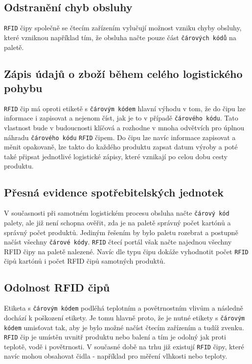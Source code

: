 \documentclass[czech,BP]{thesiskiv}
\begin{document}
\subsection{Odstranění chyb obsluhy}
\texttt{RFID} čipy společně se čtecím zařízením vylučují možnost vzniku chyby obsluhy, které vzniknou například tím, že obsluha načte pouze část \texttt{čárových kódů} na paletě.\cite{dolevcek2010identifikace}

\subsection{Zápis údajů o zboží během celého logistického pohybu}
\texttt{RFID} čip má oproti etiketě s \texttt{čárovým kódem} hlavní výhodu v tom, že do čipu lze informace i zapisovat a nejenom číst, jak je to v případě \texttt{čárového kódu}. Tato vlastnost bude v budoucnosti klíčová a rozhodne v mnoha odvětvích pro úplnou náhradu \texttt{čárového kódu} \texttt{RFID} čipem. Do čipu lze navíc informace zapisovat a měnit opakovaně, lze takto do každého produktu zapsat datum výroby a poté také připsat jednotlivé logistické zápisy, které vznikají po celou dobu cesty produktu.\cite{dolevcek2010identifikace}

\subsection{Přesná evidence spotřebitelských jednotek}
V současnosti při samotném logistickém procesu obsluha načte \texttt{čárový kód} palety, ale již není schopna ověřit, zda je na paletě správný počet kartónů a správný počet produktů. Jediným řešením by bylo paletu rozebrat a postupně načíst všechny \texttt{čárové kódy}. \texttt{RFID} čtecí portál však načte najednou všechny RFID čipy na paletě nalezené. Navíc dle typu čipu dokáže vyhodnotit počet \texttt{RFID} čipů kartónů i počet RFID čipů samotných produktů.\cite{dolevcek2010identifikace}

\subsection{Odolnost RFID čipů}
Etiketa s \texttt{čárovým kódem} podléhá teplotním a povětrnostním vlivům a následně dochází k poškození etikety. Je tomu hlavně proto, že je nutné etikety s \texttt{čárovým kódem} umisťovat tak, aby je bylo možné načíst čtecím zařízením a tudíž zvenku. \texttt{RFID} čip je umístěn uvnitř produktu nebo balení a tím je odolný jak proti teplotě, vodě i povětrnosti. V současné době na trhu již existují \texttt{RFID} čipy, které navíc mohou obsahovat čidla - například pro měření vlhkosti nebo teploty. \cite{dolevcek2010identifikace}
\end{document}
